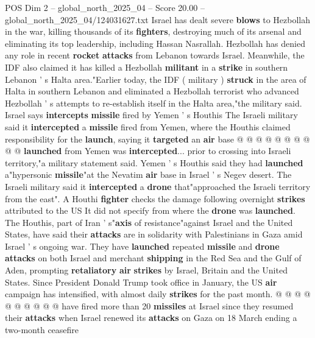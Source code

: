 \begin{textsample}{POS Dim 2 – global\_north\_2025\_04 – Score 20.00 – global\_north\_2025\_04/124031627.txt}
Israel has dealt severe \textbf{blows} to Hezbollah in the war, killing thousands of its \textbf{fighters}, destroying much of its arsenal and eliminating its top leadership, including Hassan Nasrallah.
Hezbollah has denied any role in recent \textbf{rocket} \textbf{attacks} from Lebanon towards Israel.
Meanwhile, the IDF also claimed it has killed a Hezbollah \textbf{militant} in a \textbf{strike} in southern Lebanon ' s Halta area."Earlier today, the IDF ( military ) \textbf{struck} in the area of Halta in southern Lebanon and eliminated a Hezbollah terrorist who advanced Hezbollah ' s attempts to re-establish itself in the Halta area,"the military said.
Israel says \textbf{intercepts} \textbf{missile} fired by Yemen ' s Houthis The Israeli military said it \textbf{intercepted} a \textbf{missile} fired from Yemen, where the Houthis claimed responsibility for the \textbf{launch}, saying it \textbf{targeted} an \textbf{air} base @ @ @ @ @ @ @ @ @ @ \textbf{launched} from Yemen was \textbf{intercepted}... prior to crossing into Israeli territory,"a military statement said.
Yemen ' s Houthis said they had \textbf{launched} a"hypersonic \textbf{missile}"at the Nevatim \textbf{air} base in Israel ' s Negev desert.
The Israeli military said it \textbf{intercepted} a \textbf{drone} that"approached the Israeli territory from the east".
A Houthi \textbf{fighter} checks the damage following overnight \textbf{strikes} attributed to the US It did not specify from where the \textbf{drone} was \textbf{launched}.
The Houthis, part of Iran ' s"\textbf{axis} of resistance"against Israel and the United States, have said their \textbf{attacks} are in solidarity with Palestinians in Gaza amid Israel ' s ongoing war.
They have \textbf{launched} repeated \textbf{missile} and \textbf{drone} \textbf{attacks} on both Israel and merchant \textbf{shipping} in the Red Sea and the Gulf of Aden, prompting \textbf{retaliatory} \textbf{air} \textbf{strikes} by Israel, Britain and the United States.
Since President Donald Trump took office in January, the US \textbf{air} campaign has intensified, with almost daily \textbf{strikes} for the past month. @ @ @ @ @ @ @ @ @ @ have fired more than 20 \textbf{missiles} at Israel since they resumed their \textbf{attacks} when Israel renewed its \textbf{attacks} on Gaza on 18 March ending a two-month ceasefire

\end{textsample}
